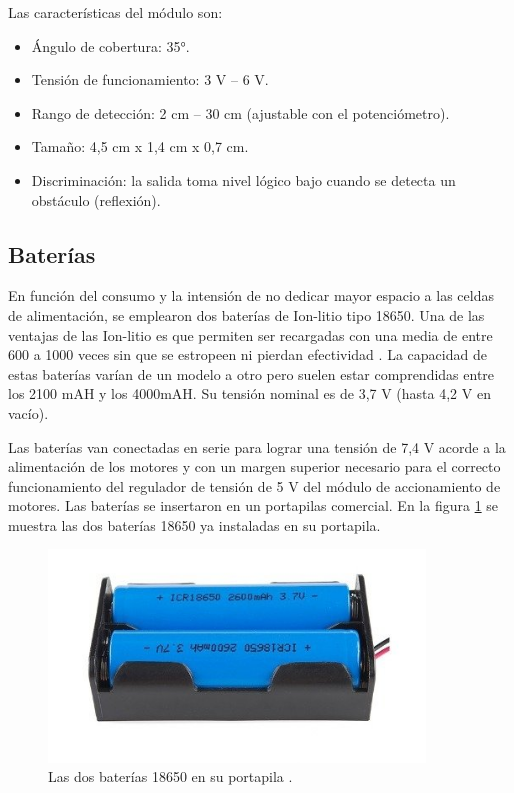 Las características del módulo son:
\begin{itemize}
	\item Ángulo de cobertura: 35°.
	\item Tensión de funcionamiento: 3 V – 6 V.
	\item Rango de detección: 2 cm – 30 cm (ajustable con el potenciómetro).
	\item Tamaño: 4,5 cm x 1,4 cm x 0,7 cm. 
	\item Discriminación: la salida toma nivel lógico bajo cuando se detecta un obstáculo (reflexión).
\end{itemize}



\subsection{Baterías}

En función del consumo y la intensión de no dedicar mayor espacio a las celdas de alimentación, se emplearon dos baterías de Ion-litio tipo 18650. Una de las ventajas de las Ion-litio es que permiten ser recargadas con una media de entre 600 a 1000 veces sin que se estropeen ni pierdan efectividad \citep{18650}. La capacidad de estas baterías varían de un modelo a otro pero suelen estar comprendidas entre los 2100 mAH y los 4000mAH. Su tensión nominal es de 3,7 V (hasta 4,2 V en vacío).

Las baterías van conectadas en serie para lograr una tensión de 7,4 V acorde a la alimentación de los motores y con un margen superior necesario para el correcto funcionamiento del regulador de tensión de 5 V del módulo de accionamiento de motores. 
Las baterías se insertaron en un portapilas comercial. En la figura \ref{fig:portapila} se muestra las dos baterías 18650 ya instaladas en su portapila.


\begin{figure}[h]
	\centering
	\includegraphics[width=10cm]{./Figures/portapilas.PNG}
	\caption{Las dos baterías 18650 en su portapila .}
	\label{fig:portapila}
\end{figure}



